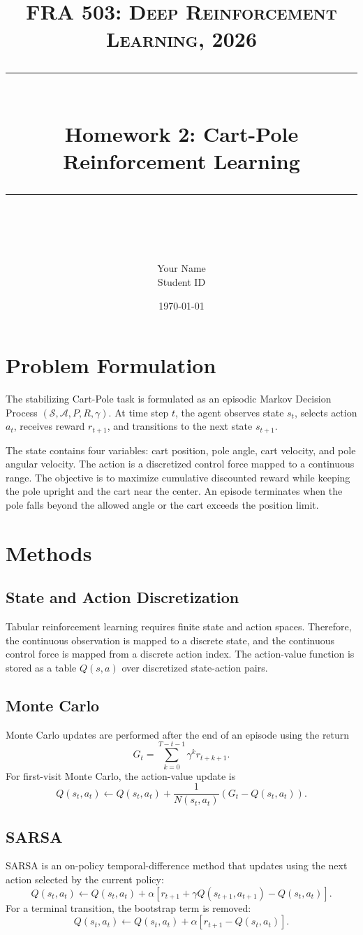 \documentclass[11pt]{article} %
\title{
\normalfont \normalsize
\textsc{FRA 503: Deep Reinforcement Learning, 2026} \\
[10pt]
\rule{\linewidth}{0.5pt} \\[6pt]
\huge Homework 2: Cart-Pole Reinforcement Learning \\
\rule{\linewidth}{2pt} \\[10pt]
}
\author{Your Name \\ Student ID}
\date{\normalsize \today}
\begin{document}
\maketitle

\section{Problem Formulation}
The stabilizing Cart-Pole task is formulated as an episodic Markov Decision Process $(\mathcal{S}, \mathcal{A}, P, R, \gamma)$. At time step $t$, the agent observes state $s_t$, selects action $a_t$, receives reward $r_{t+1}$, and transitions to the next state $s_{t+1}$.

The state contains four variables: cart position, pole angle, cart velocity, and pole angular velocity. The action is a discretized control force mapped to a continuous range. The objective is to maximize cumulative discounted reward while keeping the pole upright and the cart near the center. An episode terminates when the pole falls beyond the allowed angle or the cart exceeds the position limit.

\section{Methods}

\subsection{State and Action Discretization}
Tabular reinforcement learning requires finite state and action spaces. Therefore, the continuous observation is mapped to a discrete state, and the continuous control force is mapped from a discrete action index. The action-value function is stored as a table $Q(s,a)$ over discretized state-action pairs.

\subsection{Monte Carlo}
Monte Carlo updates are performed after the end of an episode using the return
\[
G_t = \sum_{k=0}^{T-t-1}\gamma^k r_{t+k+1}.
\]
For first-visit Monte Carlo, the action-value update is
\[
Q(s_t,a_t) \leftarrow Q(s_t,a_t) + \frac{1}{N(s_t,a_t)}\left(G_t - Q(s_t,a_t)\right).
\]

\subsection{SARSA}
SARSA is an on-policy temporal-difference method that updates using the next action selected by the current policy:
\[
Q(s_t,a_t) \leftarrow Q(s_t,a_t) + \alpha \left[r_{t+1} + \gamma Q(s_{t+1},a_{t+1}) - Q(s_t,a_t)\right].
\]
For a terminal transition, the bootstrap term is removed:
\[
Q(s_t,a_t) \leftarrow Q(s_t,a_t) + \alpha \left[r_{t+1} - Q(s_t,a_t)\right].
\]
\end{document}
